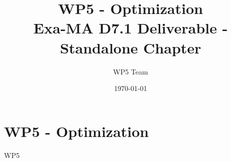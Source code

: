 \documentclass[11pt]{report}
\begin{document}
\title{WP5 - Optimization\\
\large Exa-MA D7.1 Deliverable - Standalone Chapter}
\author{WP5 Team}
\date{\today}
\maketitle

\tableofcontents
\clearpage

\chapter{WP5 - Optimization}
\label{chap:wp5}

{WP5}

\clearpage


\end{document}
